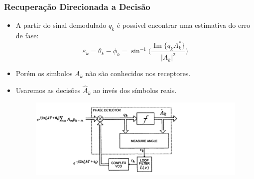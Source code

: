 \begin{frame}
	\frametitle{Recuperação Direcionada a Decisão}
	\begin{itemize}
		
		\item A partir do sinal demodulado $q_k$ é possível encontrar uma estimativa do erro de fase:
		\begin{equation*}
			\varepsilon_k=\theta_k - \phi_k= \sin^{-1}\biggl(\frac{\operatorname{Im}\{q_k A_k^*\}}{|A_k|^2}\biggr)
		\end{equation*}
		
		\item Porém os simbolos $A_k$ não são conhecidos nos receptores.
		\item Usaremos as decisões $\hat{A}_k$ ao invés dos símbolos reais. 
		
		\begin{figure}
			\includegraphics[width=0.9\columnwidth]{figs/DDPLL}
		\end{figure}

	\end{itemize}
	
\end{frame}


